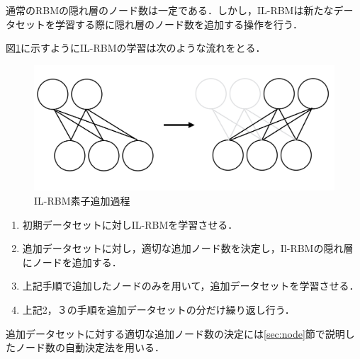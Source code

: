 通常のRBMの隠れ層のノード数は一定である．しかし，IL-RBMは新たなデータセットを学習する際に隠れ層のノード数を追加する操作を行う．

図\ref{fig:ilrbm}に示すようにIL-RBMの学習は次のような流れをとる．

\begin{figure}[tb]
 \begin{center}
  \includegraphics[scale=0.5]{./koki/ilrbm.png}
  \hspace*{0cm}
  \vspace*{0cm} 
  \caption{IL-RBM素子追加過程}
  \label{fig:ilrbm}
 \end{center}
\end{figure}

\begin{enumerate}
  \item 初期データセットに対しIL-RBMを学習させる．
  \item 追加データセットに対し，適切な追加ノード数を決定し，Il-RBMの隠れ層にノードを追加する．
  \item 上記手順で追加したノードのみを用いて，追加データセットを学習させる．
  \item 上記2，３の手順を追加データセットの分だけ繰り返し行う．
\end{enumerate}

追加データセットに対する適切な追加ノード数の決定には\ref{sec:node}節で説明したノード数の自動決定法を用いる．